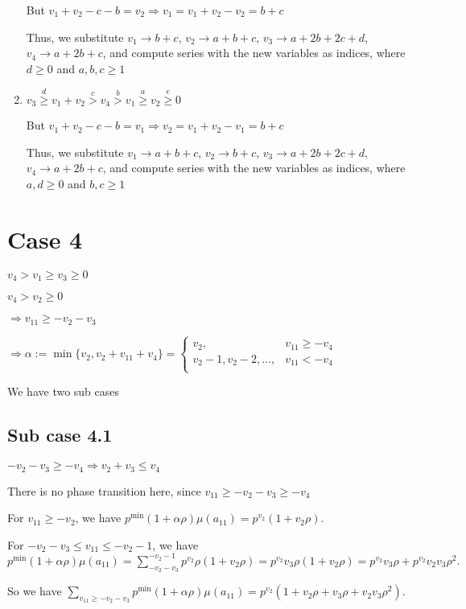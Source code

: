 \documentclass{article}
\begin{document}
\begin{enumerate}
But $v_1+v_2-c-b=v_2\Rightarrow{v_1=v_1+v_2-v_2=b+c}$

Thus, we substitute 
$v_1\rightarrow{b+c}$, 
$v_2\rightarrow{a+b+c}$, 
$v_3\rightarrow{a+2b+2c+d}$, 
$v_4\rightarrow{a+2b+c}$, and compute series with the new variables as indices, where $d\geq{0}$ and $a,b,c\geq{1}$
\item 
$v_3\overset{d}{\geq}v_1+v_2\overset{c}{>}v_4\overset{b}{>}{v_1}\overset{a}{\geq}v_2\overset{e}{\geq}{0}$

But $v_1+v_2-c-b=v_1\Rightarrow{v_2=v_1+v_2-v_1=b+c}$

Thus, we substitute 
$v_1\rightarrow{a+b+c}$, 
$v_2\rightarrow{b+c}$, 
$v_3\rightarrow{a+2b+2c+d}$, 
$v_4\rightarrow{a+2b+c}$, and compute series with the new variables as indices, where $a,d\geq{0}$ and $b,c\geq{1}$

\end{enumerate}

\section{Case 4}
$v_4>v_1\geq{v_3}\geq{0}$

$v_4>v_2\geq{0}$

$\Rightarrow{v_{11}}\geq{-v_2-v_3}$

$\Rightarrow\alpha:=\min\{v_2,v_2+v_{11}+v_4\}=\begin{cases}
       v_2, & v_{11}\geq{-v_4}\\
       v_2-1,v_2-2,\dots, & v_{11}<{-v_4}\\
     \end{cases}$

We have two sub cases

\subsection{Sub case 4.1}
$-v_2-v_3\geq{-v_4}\Rightarrow{v_2+v_3\leq{v_4}}$

There is no phase transition here, since $v_{11}\geq{-v_2-v_3}\geq{-v_4}$

For $v_{11}\geq{-v_2}$, we have $p^{\min}(1+\alpha\rho)\mu(a_{11})=p^{v_2}(1+v_2\rho).$

For $-v_2-v_3\leq{v_{11}}\leq{-v_2-1}$, we have $p^{\min}(1+\alpha\rho)\mu(a_{11})=\sum_{-v_2-v_3}^{-v_2-1}p^{v_2}\rho(1+v_2\rho)=p^{v_2}v_3\rho(1+v_2\rho)=p^{v_2}v_3\rho+p^{v_2}v_2v_3\rho^2.$

So we have $\sum_{v_{11}\geq{-v_2-v_3}}p^{\min}(1+\alpha\rho)\mu(a_{11})=p^{v_2}(1+v_2\rho+v_3\rho+v_2v_3\rho^2).$
\end{document}
